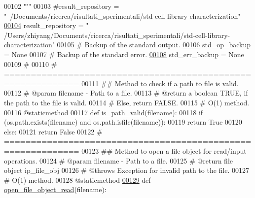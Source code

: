 \begin{DoxyCode}
00102 \textcolor{stringliteral}{    """}
00103     \textcolor{comment}{#result\_repository = "~/Documents/ricerca/risultati\_sperimentali/std-cell-library-characterization"}
\hypertarget{file__io_8py_source_l00104}{}\hyperlink{classutilities_1_1file__io_1_1file__io__operations_a7d92fe3b9053aa784ce73062bed07bd5}{00104}     result\_repository = \textcolor{stringliteral}{"
      /Users/zhiyang/Documents/ricerca/risultati\_sperimentali/std-cell-library-characterization"}
00105     \textcolor{comment}{# Backup of the standard output.}
\hypertarget{file__io_8py_source_l00106}{}\hyperlink{classutilities_1_1file__io_1_1file__io__operations_ae84964a620a018ec377b7e53f241dbf7}{00106}     std\_op\_backup = \textcolor{keywordtype}{None}
00107     \textcolor{comment}{# Backup of the standard error.}
\hypertarget{file__io_8py_source_l00108}{}\hyperlink{classutilities_1_1file__io_1_1file__io__operations_a979e9173080e7b88f0c296409a26ac01}{00108}     std\_err\_backup = \textcolor{keywordtype}{None}
00109     \textcolor{comment}{#}
00110     \textcolor{comment}{# ============================================================}
00111     \textcolor{comment}{##  Method to check if a path to file is valid.}
00112     \textcolor{comment}{#   @param filename - Path to a file.}
00113     \textcolor{comment}{#   @return a boolean TRUE, if the path to the file is valid.}
00114     \textcolor{comment}{#       Else, return FALSE.}
00115     \textcolor{comment}{#   O(1) method.}
00116     @staticmethod
\hypertarget{file__io_8py_source_l00117}{}\hyperlink{classutilities_1_1file__io_1_1file__io__operations_a5c4be751037b1ba20bb57884b93e7445}{00117}     \textcolor{keyword}{def }\hyperlink{classutilities_1_1file__io_1_1file__io__operations_a5c4be751037b1ba20bb57884b93e7445}{is\_path\_valid}(filename):
00118         \textcolor{keywordflow}{if} (os.path.exists(filename) \textcolor{keywordflow}{and} os.path.isfile(filename)):
00119             \textcolor{keywordflow}{return} \textcolor{keyword}{True}
00120         \textcolor{keywordflow}{else}:
00121             \textcolor{keywordflow}{return} \textcolor{keyword}{False}
00122     \textcolor{comment}{# ============================================================}
00123     \textcolor{comment}{##  Method to open a file object for read/input operations.}
00124     \textcolor{comment}{#   @param filename - Path to a file.}
00125     \textcolor{comment}{#   @return file object ip\_file\_obj}
00126     \textcolor{comment}{#   @throws Exception for invalid path to the file.}
00127     \textcolor{comment}{#   O(1) method.}
00128     @staticmethod
\hypertarget{file__io_8py_source_l00129}{}\hyperlink{classutilities_1_1file__io_1_1file__io__operations_a1a7ef324955033ad370338fe37e68194}{00129}     \textcolor{keyword}{def }\hyperlink{classutilities_1_1file__io_1_1file__io__operations_a1a7ef324955033ad370338fe37e68194}{open\_file\_object\_read}(filename):

\end{DoxyCode}
